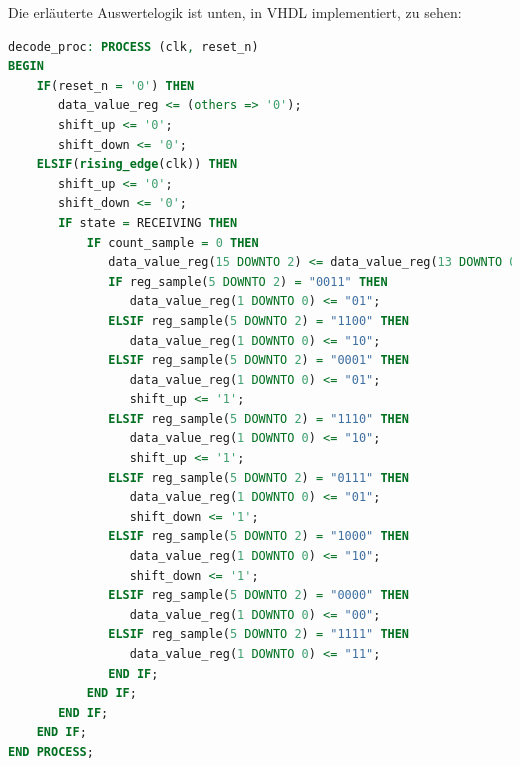 




Die erläuterte Auswertelogik ist unten, in VHDL implementiert, zu sehen:

\begin{lstlisting}[language=vhdl]
decode_proc: PROCESS (clk, reset_n)
BEGIN		
    IF(reset_n = '0') THEN
       data_value_reg <= (others => '0');
       shift_up <= '0';
       shift_down <= '0';	
    ELSIF(rising_edge(clk)) THEN
       shift_up <= '0';
       shift_down <= '0';
       IF state = RECEIVING THEN
    	   IF count_sample = 0 THEN
    	      data_value_reg(15 DOWNTO 2) <= data_value_reg(13 DOWNTO 0);
    	      IF reg_sample(5 DOWNTO 2) = "0011" THEN
    	         data_value_reg(1 DOWNTO 0) <= "01";
    	      ELSIF reg_sample(5 DOWNTO 2) = "1100" THEN
    	         data_value_reg(1 DOWNTO 0) <= "10";
    	      ELSIF reg_sample(5 DOWNTO 2) = "0001" THEN
    	         data_value_reg(1 DOWNTO 0) <= "01";
    	         shift_up <= '1';
    	      ELSIF reg_sample(5 DOWNTO 2) = "1110" THEN
    	         data_value_reg(1 DOWNTO 0) <= "10";
    	         shift_up <= '1';
    	      ELSIF reg_sample(5 DOWNTO 2) = "0111" THEN
    	         data_value_reg(1 DOWNTO 0) <= "01";
    	         shift_down <= '1';
    	      ELSIF reg_sample(5 DOWNTO 2) = "1000" THEN
    	         data_value_reg(1 DOWNTO 0) <= "10";
    	         shift_down <= '1';
    	      ELSIF reg_sample(5 DOWNTO 2) = "0000" THEN
    	         data_value_reg(1 DOWNTO 0) <= "00";
    	      ELSIF reg_sample(5 DOWNTO 2) = "1111" THEN
    	         data_value_reg(1 DOWNTO 0) <= "11";
              END IF;
    	   END IF;
       END IF;		
    END IF;
END PROCESS;
\end{lstlisting}

